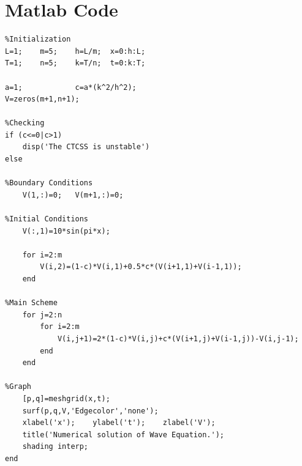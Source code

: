 \clearpage
\section{Matlab Code}
\begin{verbatim}
%Initialization
L=1;	m=5;	h=L/m;	x=0:h:L;
T=1;	n=5;	k=T/n;	t=0:k:T;

a=1;			c=a*(k^2/h^2);
V=zeros(m+1,n+1);

%Checking
if (c<=0|c>1)
    disp('The CTCSS is unstable')
else

%Boundary Conditions
    V(1,:)=0;	V(m+1,:)=0;

%Initial Conditions
    V(:,1)=10*sin(pi*x);

    for i=2:m
        V(i,2)=(1-c)*V(i,1)+0.5*c*(V(i+1,1)+V(i-1,1));
    end

%Main Scheme
    for j=2:n
        for i=2:m
            V(i,j+1)=2*(1-c)*V(i,j)+c*(V(i+1,j)+V(i-1,j))-V(i,j-1);
        end
    end

%Graph
    [p,q]=meshgrid(x,t);
    surf(p,q,V,'Edgecolor','none');
    xlabel('x');	ylabel('t');	zlabel('V');
    title('Numerical solution of Wave Equation.');
    shading interp;
end
\end{verbatim}
